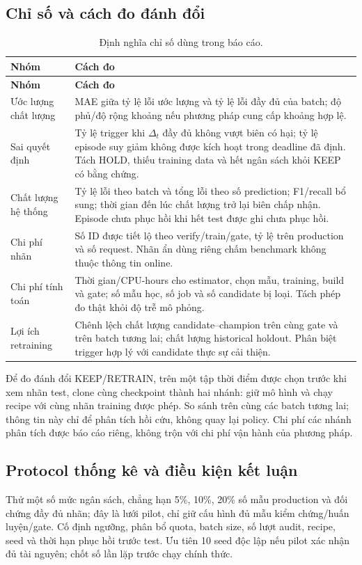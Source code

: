 \subsection{Chỉ số và cách đo đánh đổi}
\begin{xltabular}{\linewidth}{@{}L{3.4cm} Y@{}}
\caption{Định nghĩa chỉ số dùng trong báo cáo.}\label{tab:metrics}\\
\toprule\textbf{Nhóm} & \textbf{Cách đo} \\
\midrule\endfirsthead
\toprule\textbf{Nhóm} & \textbf{Cách đo} \\
\midrule\endhead
Ước lượng chất lượng & MAE giữa tỷ lệ lỗi ước lượng và tỷ lệ lỗi đầy đủ của batch; độ phủ/độ rộng khoảng nếu phương pháp cung cấp khoảng hợp lệ. \\
Sai quyết định & Tỷ lệ trigger khi $\Delta_t$ đầy đủ không vượt biên có hại; tỷ lệ episode suy giảm không được kích hoạt trong deadline đã định. Tách HOLD, thiếu training data và hết ngân sách khỏi KEEP có bằng chứng. \\
Chất lượng hệ thống & Tỷ lệ lỗi theo batch và tổng lỗi theo số prediction; F1/recall bổ sung; thời gian đến lúc chất lượng trở lại biên chấp nhận. Episode chưa phục hồi khi hết test được ghi chưa phục hồi. \\
Chi phí nhãn & Số ID được tiết lộ theo verify/train/gate, tỷ lệ trên production và số request. Nhãn ẩn dùng riêng chấm benchmark không thuộc thông tin online. \\
Chi phí tính toán & Thời gian/CPU-hours cho estimator, chọn mẫu, training, build và gate; số mẫu học, số job và số candidate bị loại. Tách phép đo thật khỏi độ trễ mô phỏng. \\
Lợi ích retraining & Chênh lệch chất lượng candidate--champion trên cùng gate và trên batch tương lai; chất lượng historical holdout. Phân biệt trigger hợp lý với candidate thực sự cải thiện. \\
\bottomrule
\end{xltabular}

Để đo đánh đổi KEEP/RETRAIN, trên một tập thời điểm được chọn trước khi xem nhãn test, clone cùng checkpoint thành hai nhánh: giữ mô hình và chạy recipe với cùng nhãn training được phép. So sánh trên cùng các batch tương lai; thông tin này chỉ để phân tích hồi cứu, không quay lại policy. Chi phí các nhánh phân tích được báo cáo riêng, không trộn với chi phí vận hành của phương pháp.

\subsection{Protocol thống kê và điều kiện kết luận}
Thử một số mức ngân sách, chẳng hạn 5\%, 10\%, 20\% số mẫu production và đối chứng đầy đủ nhãn; đây là lưới pilot, chỉ giữ cấu hình đủ mẫu kiểm chứng/huấn luyện/gate. Cố định ngưỡng, phân bổ quota, batch size, số lượt audit, recipe, seed và thời hạn phục hồi trước test. Ưu tiên 10 seed độc lập nếu pilot xác nhận đủ tài nguyên; chốt số lần lặp trước chạy chính thức.

